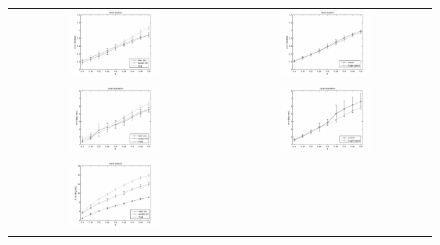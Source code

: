 
\begin{figure}[htbp]
  \begin{center}
    \begin{tabular}{cc}
      \includegraphics[width=0.45\textwidth]{error_pos.eps} &
      \includegraphics[width=0.45\textwidth]{error_cmp_pos.eps} \\
      \includegraphics[width=0.45\textwidth]{error_ori.eps} &
      \includegraphics[width=0.45\textwidth]{error_cmp_ori.eps} \\
      \includegraphics[width=0.45\textwidth]{error_pst.eps} &

\end{tabular}
\end{center}
\end{figure}
